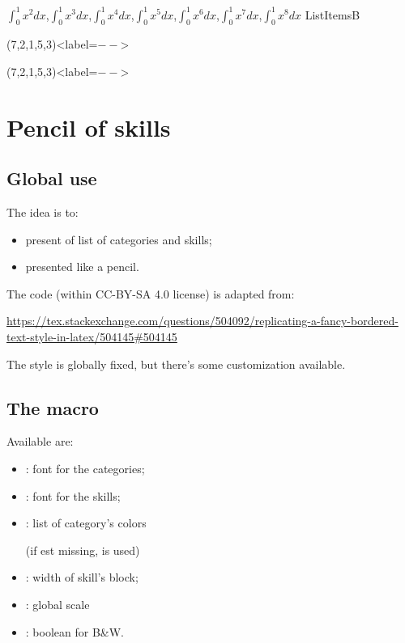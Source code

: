 \documentclass[english,11pt,a4paper]{article}
\begin{document}
\CreateItemsList%
{{$\int_0^1 x^2 dx$},{$\int_0^1 x^3 dx$},{$\int_0^1 x^4 dx$},{$\int_0^1 x^5 dx$},{$\int_0^1 x^6 dx$},{$\int_0^1 x^7 dx$},{$\int_0^1 x^8 dx$}}%
{\mylistofitemsb}{ListItemsB}

\begin{codehigh}[language=latex/latex3,style/main=teal!25,style/code=teal!25]
(7,2,1,5,3)<label=$--$>
\end{codehigh}

(7,2,1,5,3)<label=$--$>

\pagebreak

\section{Pencil of skills}

\subsection{Global use}

The idea is to:

\begin{itemize}
	\item present of list of categories and skills;
	\item presented like a pencil.
\end{itemize}

The code (within CC-BY-SA 4.0 license) is adapted from:

\hfill{\footnotesize \url{https://tex.stackexchange.com/questions/504092/replicating-a-fancy-bordered-text-style-in-latex/504145#504145}}\hfill~

\begin{codehigh}[language=latex/latex3,style/main=teal!25,style/code=teal!25]
\end{codehigh}

The style is globally fixed, but there's some customization available.

\subsection{The macro}

Available  are:

\begin{itemize}
	\item {}: font for the categories;
	\item {}: font for the skills;
	\item {}: list of category's colors


	(if  est missing,  is used)
	\item {}: width of skill's block;
	\item {}: global scale
	\item {}: boolean for B\&W.
\end{itemize}
\end{document}
